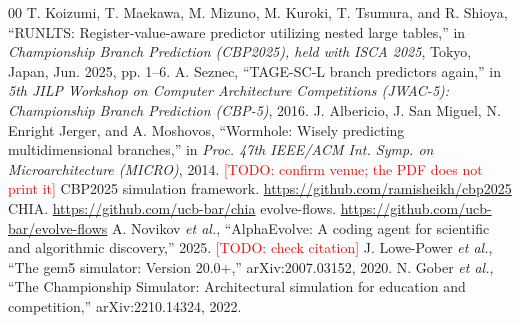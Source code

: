 \documentclass[conference]{IEEEtran}
\newcommand{\todo}[1]{\textcolor{red}{[TODO: #1]}}
\begin{document}
\begin{thebibliography}{00}
 T. Koizumi, T. Maekawa, M. Mizuno, M. Kuroki, T. Tsumura, and
R. Shioya, ``RUNLTS: Register-value-aware predictor utilizing nested large
tables,'' in \emph{Championship Branch Prediction (CBP2025), held with ISCA
2025}, Tokyo, Japan, Jun. 2025, pp. 1--6.
 A. Seznec, ``TAGE-SC-L branch predictors again,'' in
\emph{5th JILP Workshop on Computer Architecture Competitions (JWAC-5):
Championship Branch Prediction (CBP-5)}, 2016.
 J. Albericio, J. San Miguel, N. Enright Jerger, and
A. Moshovos, ``Wormhole: Wisely predicting multidimensional branches,'' in
\emph{Proc. 47th IEEE/ACM Int. Symp. on Microarchitecture (MICRO)}, 2014.
\todo{confirm venue; the PDF does not print it}
 CBP2025 simulation framework.
\url{https://github.com/ramisheikh/cbp2025}
 CHIA. \url{https://github.com/ucb-bar/chia}
 evolve-flows. \url{https://github.com/ucb-bar/evolve-flows}
 A. Novikov \emph{et al.}, ``AlphaEvolve: A coding agent
for scientific and algorithmic discovery,'' 2025. \todo{check citation}
 J. Lowe-Power \emph{et al.}, ``The gem5 simulator: Version
20.0+,'' arXiv:2007.03152, 2020.
 N. Gober \emph{et al.}, ``The Championship Simulator:
Architectural simulation for education and competition,'' arXiv:2210.14324,
2022.
\end{thebibliography}
\end{document}
